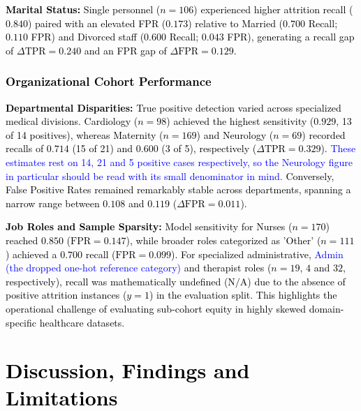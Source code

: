 \documentclass[a4paper,fleqn]{cas-sc}
\begin{document}
\textcolor{black}{\textbf{Marital Status:} Single personnel ($n = 106$) experienced higher attrition recall ($0.840$) paired with an elevated FPR ($0.173$) relative to Married ($0.700$ Recall; $0.110$ FPR) and Divorced staff ($0.600$ Recall; $0.043$ FPR), generating a recall gap of $\Delta\text{TPR} = 0.240$ and an FPR gap of $\Delta\text{FPR} = 0.129$.}

\textcolor{black}{\subsubsection*{Organizational Cohort Performance}
\textcolor{black}{\textbf{Departmental Disparities:} True positive detection varied across specialized medical divisions. Cardiology ($n = 98$) achieved the highest sensitivity ($0.929$, 13 of 14 positives), whereas Maternity ($n = 169$) and Neurology ($n = 69$) recorded recalls of $0.714$ (15 of 21) and $0.600$ (3 of 5), respectively ($\Delta\text{TPR} = 0.329$). \textcolor{blue}{These estimates rest on 14, 21 and 5 positive cases respectively, so the Neurology figure in particular should be read with its small denominator in mind.} Conversely, False Positive Rates remained remarkably stable across departments, spanning a narrow range between $0.108$ and $0.119$ ($\Delta\text{FPR} = 0.011$).}

\textcolor{black}{\textbf{Job Roles and Sample Sparsity:} Model sensitivity for Nurses ($n = 170$) reached $0.850$ ($\text{FPR} = 0.147$), while broader roles categorized as 'Other' ($n = 111$) achieved a $0.700$ recall ($\text{FPR} = 0.099$). For specialized administrative, \textcolor{blue}{Admin (the dropped one-hot reference category)} and therapist roles ($n = 19$, $4$ and $32$, respectively), recall was mathematically undefined ($\text{N/A}$) due to the absence of positive attrition instances ($y = 1$) in the evaluation split. This highlights the operational challenge of evaluating sub-cohort equity in highly skewed domain-specific healthcare datasets.}

\section{Discussion, Findings and Limitations}
\label{sec:disc}
}
\end{document}
